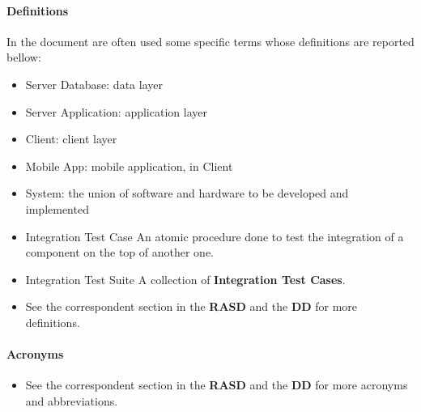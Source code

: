 \paragraph{Definitions}
In the document are often used some specific terms whose definitions are reported bellow:
\begin{itemize}
	\item Server Database: data layer
	\item Server Application: application layer
	\item Client: client layer
	\item Mobile App: \PowerEnJoy{} mobile application, in Client
	\item System: the union of software and hardware to be developed and implemented
	\item{Integration Test Case} An atomic procedure done to test the integration of a component on the top of another one.
	\item{Integration Test Suite} A collection of \textbf{Integration Test Cases}.
	\item See the correspondent section in the \textbf{RASD} and the \textbf{DD} for more definitions.
\end{itemize}
\paragraph{Acronyms}
\begin{itemize}
	 Requirements Analysis and Specification Document
	 Design Document
	 Application Programming Interface
	 DataBase Management System
	 Integration Test Plan Document.
	 Integration Test Suite number n.
	 Integration Test Case number m of the Integration Test Suite number n.
	 JavaScript.
	 User Interface.
	\item See the correspondent section in the \textbf{RASD} and the \textbf{DD} for more acronyms and abbreviations.
\end{itemize}
